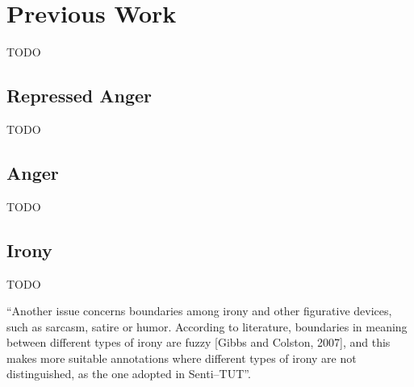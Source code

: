 
\section{Previous Work}
\label{sec:previous_work}

TODO

\subsection{Repressed Anger}
\label{subsec:repressed_anger}

TODO

\subsection{Anger}
\label{subsec:anger}

TODO

\subsection{Irony}
\label{subsec:irony}

TODO

\cite{sulis2016figurative}
\cite{carvalho2009clues}

``Another issue concerns boundaries among irony and other figurative devices, such as sarcasm, satire or humor. According to literature, boundaries in meaning between different types of irony are fuzzy [Gibbs and Colston, 2007], and this makes more suitable annotations where different types of irony are not distinguished, as the one adopted in Senti–TUT''\cite{bosco2013developing}.